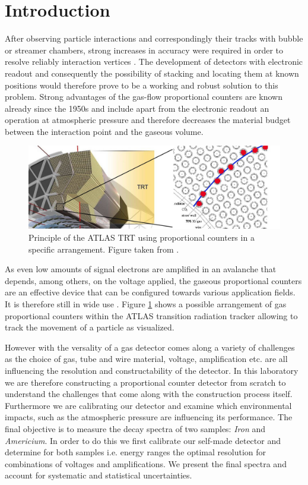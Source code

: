\section{Introduction}  \label{sec:Introduction}
After observing particle interactions and correspondingly their tracks with
bubble or streamer chambers, strong increases in accuracy were required in order
to resolve reliably interaction vertices \cite{charpak_high-resolution_1984}.
The development of detectors with electronic readout and consequently the
possibility of stacking and locating them at known positions would therefore
prove to be a working and robust solution to this problem. Strong advantages of
the gas-flow proportional counters are known already since the 1950s \cite{hendee_gasflow_1956} and include
apart from the electronic readout an operation at atmospheric pressure and
therefore decreases the material budget between the interaction point and the
gaseous volume.

\begin{figure}[H]
  \includegraphics[width=\linewidth]{graphics/ATLAS_TRT_Principle_image}
  \caption{Principle of the ATLAS TRT using proportional counters in a specific
    arrangement. Figure taken from \cite{colliderscope}.}
  \label{fig:colliderscope}
\end{figure}

As even low amounts of signal electrons are amplified in an
avalanche that depends, among others, on the voltage applied, the gaseous
proportional counters are an effective device that can be configured towards
various application fields. It is therefore still in wide use
\cite{Mindur:2017nqn}. Figure \ref{fig:colliderscope} shows a possible
arrangement of gas proportional counters within the ATLAS transition radiation
tracker allowing to track the movement of a particle as visualized.

However with the versality of a gas detector comes along a variety of challenges
as the choice of gas, tube and wire material, voltage, amplification etc. are
all influencing the resolution and constructability of the detector. In this
laboratory we are therefore constructing a proportional counter detector from
scratch to understand the challenges that come along with the construction
process itself. Furthermore we are calibrating our detector and examine which
environmental impacts, such as the atmospheric pressure are influencing its
performance. The final objective is to measure the decay spectra of two samples:
\emph{Iron} and \emph{Americium}. In order to do this we first calibrate our self-made
detector and determine for both samples i.e. energy ranges the optimal
resolution for combinations of voltages and amplifications. We present the final
spectra and account for systematic and statistical uncertainties.